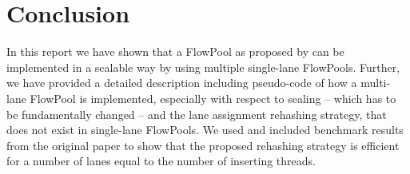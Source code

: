 \documentclass[runningheads,a4paper,fleqn]{llncs}
\begin{document}





\section{Conclusion}
In this report we have shown that a FlowPool as proposed by
\cite{FP12} can be implemented in a scalable way by using multiple
single-lane FlowPools. Further, we have provided a detailed
description including pseudo-code of how a multi-lane FlowPool is
implemented, especially with respect to sealing -- which has to be
fundamentally changed -- and the lane assignment rehashing strategy,
that does not exist in single-lane FlowPools. We used and included
benchmark results from the original paper to show that the proposed
rehashing strategy is efficient for a number of lanes equal to the
number of inserting threads.



\end{document}
